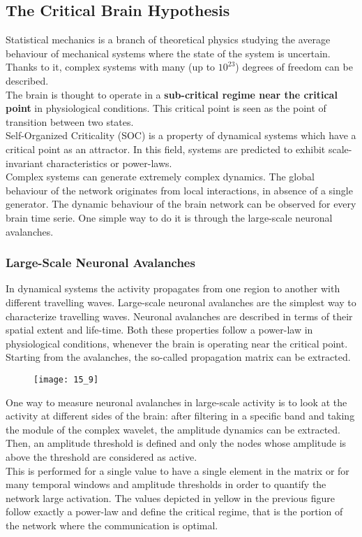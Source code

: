\subsection{The Critical Brain Hypothesis}
Statistical mechanics is a branch of theoretical physics studying the average behaviour of mechanical
systems where the state of the system is uncertain. Thanks to it, complex systems with many (up to \(10^{23}\))
degrees of freedom can be described.\\
The brain is thought to operate in a \textbf{sub-critical regime near the critical point} in
physiological conditions. This critical point is seen as the point of transition between two states.\\
Self-Organized Criticality (SOC) is a property of dynamical systems which have a critical point as an
attractor. In this field, systems are predicted to exhibit scale-invariant characteristics or power-laws.\\
Complex systems can generate extremely complex dynamics. The global behaviour of the network originates
from local interactions, in absence of a single generator. The dynamic behaviour of the brain network
can be observed for every brain time serie. One simple way to do it is through the large-scale neuronal
avalanches.
\subsubsection{Large-Scale Neuronal Avalanches}
In dynamical systems the activity propagates from one region to another with different travelling waves.
Large-scale neuronal avalanches are the simplest way to characterize travelling waves. Neuronal
avalanches are described in terms of their spatial extent and life-time. Both these properties follow a
power-law in physiological conditions, whenever the brain is operating near the critical point.
Starting from the avalanches, the so-called propagation matrix can be extracted.
\begin{figure}[H]
    \centering
    \texttt{[image: 15\_9]}
\end{figure}
One way to measure neuronal avalanches in large-scale activity is to look at the activity at different
sides of the brain: after filtering in a specific band and taking the module of the complex wavelet,
the amplitude dynamics can be extracted. Then, an amplitude threshold is defined and only the nodes
whose amplitude is above the threshold are considered as active.\\
This is performed for a single value to have a single element in the matrix or for many temporal windows
and amplitude thresholds in order to quantify the network large activation. The values depicted in yellow
in the previous figure follow exactly a power-law and define the critical regime, that is the portion of
the network where the communication is optimal.
